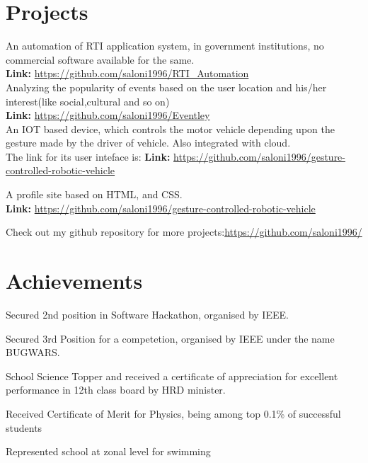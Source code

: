 \documentclass[]{hieudo-build}
\begin{document}
\begin{minipage}[t]{0.69\textwidth} 

\section{Projects}

\descript{}
An automation of RTI application system, in government institutions, no commercial software available for the same. \\
\textbf{Link:} \url{https://github.com/saloni1996/RTI_Automation}
\sectionsep\\

\descript{}
Analyzing the popularity of events based on the user location and his/her interest(like social,cultural and so on)\\
\textbf{Link:} \url{https://github.com/saloni1996/Eventley}
\sectionsep\\

\descript{}
An IOT based device, which controls the motor vehicle depending upon the gesture made by the driver of vehicle. Also integrated with cloud.\\
The link for its user inteface is: \textbf{Link:} \url{https://github.com/saloni1996/gesture-controlled-robotic-vehicle}
\sectionsep 

\descript{}
A profile site based on HTML, and CSS. \\
 \textbf{Link:} \url{https://github.com/saloni1996/gesture-controlled-robotic-vehicle}
\sectionsep

\descript{}
Check out my github repository for more projects:\url{https://github.com/saloni1996/}
\sectionsep

\section{Achievements}

\vspace{0.5em} 
\begin{tightemize}

\item Secured 2nd position in Software Hackathon, organised by IEEE.
\item Secured 3rd Position for a competetion, organised by IEEE under the name BUGWARS.
\item School Science Topper and received a certificate of appreciation for excellent performance in 12th class board by HRD minister.
\item Received Certificate of Merit for Physics, being among top 0.1\% of successful students
\item Represented school at zonal level for swimming
\end{tightemize}
\sectionsep

\end{minipage} 
\end{document}
